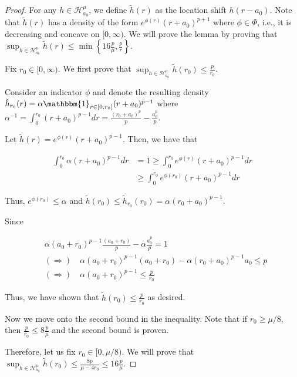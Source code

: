\documentclass[12pt]{article}
\begin{document}
\begin{proof}

  For any $h \in \mathcal{H}_{a_0}^\mu$, we define $\tilde{h}(r)$ as the location shift $h( r - a_0)$. Note that $\tilde{h}(r)$ has a density of the form $e^{\phi(r)} (r + a_0)^{p+1}$ where $\phi \in \Phi$, i.e., it is decreasing and concave on $[0, \infty)$. We will prove the lemma by proving that $\sup_{h \in \mathcal{H}_{a_0}^\mu} \tilde{h}(r) \leq \min \left\{ 16 \frac{p}{\mu}, \frac{p}{r} \right\}$.

  Fix $r_0 \in [0, \infty)$. We first prove that $\sup_{h \in \mathcal{H}_{a_0}^\mu} \tilde{h}(r_0) \leq \frac{p}{r_0}$.

  Consider an indicator $\phi$ and denote the resulting density
  $\tilde{h}_{r_0}(r) = \alpha \mathbbm{1}_{r \in [0, r_0]} (r+a_0)^{p-1}$ where
  $\alpha^{-1} = \int_0^{r_0} (r + a_0)^{p-1} dr = \frac{(r_0 + a_0)^p}{p} - \frac{a_0^p}{p}$.

  Let $\tilde{h}(r) = e^{\phi(r)} (r + a_0)^{p-1}$.
  Then, we have that

  \begin{align*}
    \int_0^{r_0} \alpha (r+a_0)^{p-1} dr &= 1
         \geq \int_0^{r_0} e^{\phi(r)} (r+a_0)^{p-1} dr \\
      &\geq \int_0^{r_0} e^{\phi(r_0)} (r + a_0)^{p-1} dr
  \end{align*}

  Thus, $e^{\phi(r_0)} \leq \alpha$ and $\tilde{h}(r_0) \leq \tilde{h}_{r_0}(r_0) = \alpha (r_0 + a_0)^{p-1}$.

  Since

  \begin{align*}
    & \alpha (a_0 + r_0)^{p-1} \frac{(a_0 + r_0)}{p}  - \alpha \frac{a_0^p}{p} = 1 \\
    &(\Rightarrow) \quad
      \alpha (a_0 + r_0)^{p-1} (a_0 + r_0) - \alpha (r_0 + a_0)^{p-1} a_0 \leq p \\
    &(\Rightarrow) \quad \alpha (a_0 + r_0)^{p-1} \leq \frac{p}{r_0}
  \end{align*}

  Thus, we have shown that $\tilde{h}(r_0) \leq \frac{p}{r_0}$ as desired.

  Now we move onto the second bound in the inequality. Note that if $r_0 \geq \mu/8$, then $\frac{p}{r_0} \leq 8 \frac{p}{\mu}$ and the second bound is proven. 
  
  Therefore, let us fix $r_0 \in [0, \mu/8)$. We will prove that
  $ \sup_{h \in \mathcal{H}_{a_0}^\mu} \tilde{h}(r_0) \leq \frac{8p}{\mu - 4 r_0} \leq 16 \frac{p}{\mu}$.
  

\end{proof}
\end{document}
